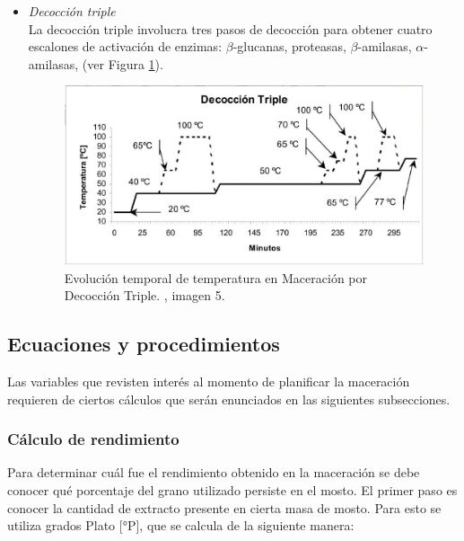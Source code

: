 \begin{itemize}
                    \item \textit{Decocción triple} \\ La decocción triple involucra tres pasos de decocción para obtener cuatro escalones de activación de enzimas: $\beta$-glucanas, proteasas, $\beta$-amilasas, $\alpha$-amilasas, (ver Figura \ref{MaceracionDecoccionTriple}).
                    
                    \begin{figure} [ht]		                                                          \centerline{\includegraphics[scale=0.5]{decoccion_triple.jpg}}
                        \caption{Evolución temporal de temperatura en Maceración por Decocción Triple. \cite{Ceresvis}, imagen 5.}
                        \label{MaceracionDecoccionTriple}
                    \end{figure}
                    
                \end{itemize}
        \hfill \break        
        \subsection{Ecuaciones y procedimientos}
            \label{EcuacionesyProcedimientos}
            \par Las variables que revisten interés al momento de planificar la maceración requieren de ciertos cálculos que serán enunciados en las siguientes subsecciones. 
            
            \subsubsection{Cálculo de rendimiento }
            \label{AT_CalculodeRendimiento}
                \par Para determinar cuál fue el rendimiento obtenido en la maceración se debe conocer qué porcentaje del grano utilizado persiste en el mosto. El primer paso es conocer la cantidad de extracto presente en cierta masa de mosto. Para esto se utiliza grados Plato [°P], que se calcula de la siguiente manera:
                

